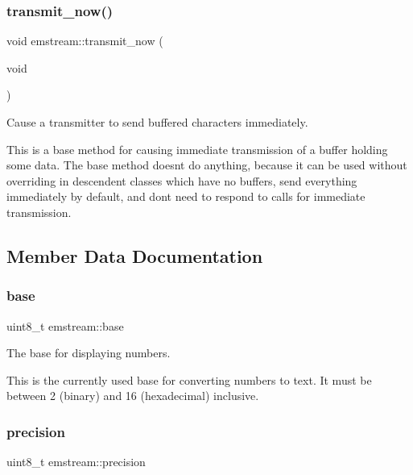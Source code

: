 \subsubsection{\texorpdfstring{transmit\+\_\+now()}{transmit\_now()}}
{\footnotesize\ttfamily void emstream\+::transmit\+\_\+now (\begin{DoxyParamCaption}\item[{void}]{ }\end{DoxyParamCaption})\hspace{0.3cm}{\ttfamily [virtual]}}



Cause a transmitter to send buffered characters immediately. 

This is a base method for causing immediate transmission of a buffer holding some data. The base method doesn\textquotesingle{}t do anything, because it can be used without overriding in descendent classes which have no buffers, send everything immediately by default, and don\textquotesingle{}t need to respond to calls for immediate transmission. 

\subsection{Member Data Documentation}
\mbox{\label{classemstream_abbf460d8c60420b025b7316f6979ad04}} 
\subsubsection{\texorpdfstring{base}{base}}
{\footnotesize\ttfamily uint8\+\_\+t emstream\+::base\hspace{0.3cm}{\ttfamily [protected]}}



The base for displaying numbers. 

This is the currently used base for converting numbers to text. It must be between 2 (binary) and 16 (hexadecimal) inclusive. \mbox{\label{classemstream_af9c514aedfafcc2567d613396bc0cf7b}} 
\subsubsection{\texorpdfstring{precision}{precision}}
{\footnotesize\ttfamily uint8\+\_\+t emstream\+::precision\hspace{0.3cm}{\ttfamily [protected]}}



